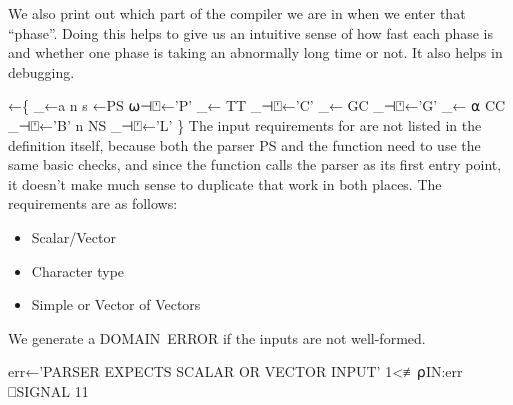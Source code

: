 \documentclass{article}%
\begin{document}
We also print out which part of the compiler we are in when we
enter that ``phase''. Doing this helps to give us an intuitive sense
of how fast each phase is and whether one phase is taking an
abnormally long time or not.
It also helps in debugging.

\nwenddocs{}\endmoddef\nwstartdeflinemarkup{}\nwenddeflinemarkup
{}←\{
        _←a n s ←PS ⍵⊣⍞←'P'
        _←          TT _⊣⍞←'C'
        _←          GC _⊣⍞←'G'
        _←        ⍺ CC _⊣⍞←'B'
                  n NS _⊣⍞←'L'
\}
\eatline
{}\nwendcode{}\nwdocspar
The input requirements for {\Tt{}\nwendquote} are not listed in the definition
itself, because both the parser {\Tt{}PS\nwendquote} and the {\Tt{}\nwendquote} function
need to use the same basic checks,
and since the {\Tt{}\nwendquote} function calls the parser
as its first entry point,
it doesn't make much sense to
duplicate that work in both places.
The requirements are as follows:

\begin{itemize}
        \item Scalar/Vector
        \item Character type
        \item Simple or Vector of Vectors
\end{itemize}

\noindent
We generate a {\Tt{}DOMAIN\ ERROR\nwendquote} if the inputs are not well-formed.

\nwenddocs{}\endmoddef\nwstartdeflinemarkup{}\nwenddeflinemarkup
err←'PARSER EXPECTS SCALAR OR VECTOR INPUT'
1<≢⍴IN:err ⎕SIGNAL 11
\end{document}
